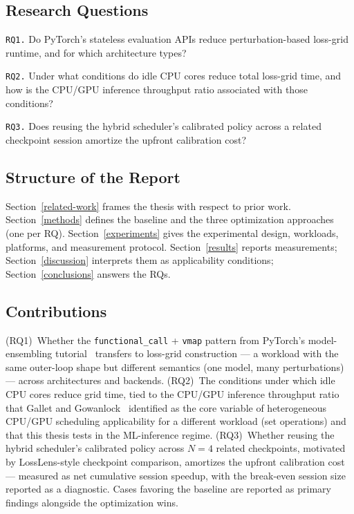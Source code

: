 \documentclass[conference]{IEEEtran}
\begin{document}
\subsection{Research Questions}\label{research-questions}

\texttt{RQ1.} Do PyTorch's stateless evaluation APIs reduce
perturbation-based loss-grid runtime, and for which architecture types?

\texttt{RQ2.} Under what conditions do idle CPU cores reduce total
loss-grid time, and how is the CPU/GPU inference throughput ratio
associated with those conditions?

\texttt{RQ3.} Does reusing the hybrid scheduler's calibrated
policy across a related checkpoint session amortize the
upfront calibration cost?

\subsection{Structure of the Report}\label{structure-of-the-report}

Section~\ref{related-work} frames the thesis with respect to prior work.
Section~\ref{methods} defines the baseline and the three
optimization approaches (one per RQ).
Section~\ref{experiments} gives the experimental design,
workloads, platforms, and measurement protocol.
Section~\ref{results} reports measurements;
Section~\ref{discussion} interprets them as applicability
conditions; Section~\ref{conclusions} answers the RQs.

\subsection{Contributions}\label{contributions}

(RQ1)~Whether the \texttt{functional\_call} + \texttt{vmap}
pattern from PyTorch's model-ensembling
tutorial~\cite{pytorch_ensembling} transfers to loss-grid
construction --- a workload with the same outer-loop shape but
different semantics (one model, many perturbations) --- across
architectures and backends.
(RQ2)~The conditions under which idle CPU cores reduce grid
time, tied to the CPU/GPU inference throughput ratio that
Gallet and Gowanlock~\cite{gallet2021heterogeneous} identified
as the core variable of heterogeneous CPU/GPU scheduling
applicability for a different workload (set operations) and
that this thesis tests in the ML-inference regime.
(RQ3)~Whether reusing the hybrid scheduler's calibrated policy
across $N=4$ related checkpoints, motivated by LossLens-style
checkpoint comparison, amortizes the upfront calibration cost
--- measured as net cumulative session speedup, with the
break-even session size reported as a diagnostic. Cases
favoring the baseline are reported as primary findings
alongside the optimization wins.
\end{document}
